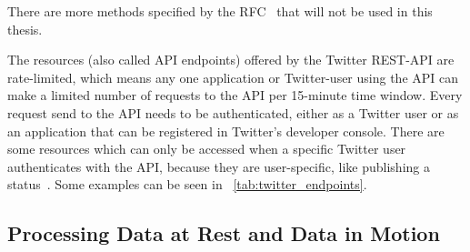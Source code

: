 There are more methods specified by the RFC~\cite{RFC2616} that will not be used in this thesis.
\par
The resources (also called API endpoints) offered by the Twitter REST-API are rate-limited,
which means any one application or Twitter-user using the API can make a limited number of requests to the API
per 15-minute time window.
Every request send to the API needs to be authenticated,
either as a Twitter user or as an application that can be registered in Twitter's developer console.
There are some resources which can only be accessed when a specific Twitter user authenticates
with the API, because they are user-specific, like publishing a status~\cite{twitterDocs}.
Some examples can be seen in ~\autoref{tab:twitter_endpoints}.

\begin{table}
    \caption{A selection of resources offered by the Twitter REST API~\cite{twitterDocs}}
    \label{tab:twitter_endpoints}
\end{table}

\subsection{Processing Data at Rest and Data in Motion}
\label{subsec:dataAtRest-DataInMotion}

